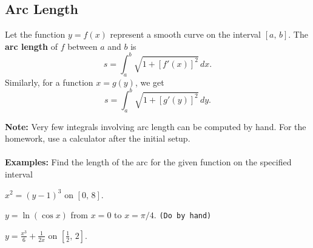 \documentclass[addpoints, 12pt]{exam}
\begin{document}
\newpage
{}
\subsection*{Arc Length}
\begin{tcolorbox}[title= DEFINITION OF ARC LENGTH, black,sharp corners,colback=white,colbacktitle=white,coltitle=black,boxrule=1pt]

    Let the function $y=f(x)$ represent a smooth curve on the interval $[a,\,b]$. The \textbf{arc length} of $f$ between $a$ and $b$ is
    \[s=\int_a^b\sqrt{1+\left[f'(x)\right]^2}\,dx.\]
    Similarly, for a function $x=g(y)$, we get
    \[s=\int_a^b\sqrt{1+\left[g'(y)\right]^2}\,dy.\]
    
\end{tcolorbox}

\textbf{Note:} Very few integrals involving arc length can be computed by hand. For the homework, use a calculator after the initial setup.\\
\\
\textbf{Examples:} Find the length of the arc for the given function on the specified interval
\begin{questions}
    \question $\displaystyle x^2=(y-1)^{3}$ on $[0,\,8]$.
    
    \question $\displaystyle y=\ln(\cos x)$ from $x=0$ to $x=\pi/4$. \texttt{(Do by hand)}
    
    \question $\displaystyle y=\frac{x^3}{6}+\frac{1}{2x}$ on $\displaystyle\left[\frac{1}{2},\,2\right]$.
\end{questions}

\newpage
{}
\end{document}
